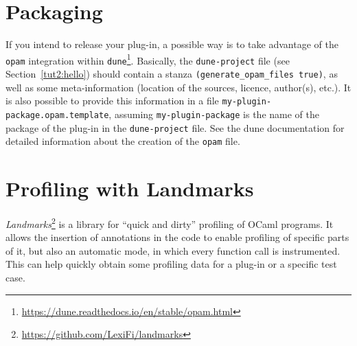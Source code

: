 



\section{Packaging}
\label{sec:dune-packaging}

If you intend to release your plug-in, a possible way is to take advantage of
the \texttt{opam} integration within
\texttt{dune}\footnote{\url{https://dune.readthedocs.io/en/stable/opam.html}}.
Basically, the \texttt{dune-project} file
(see Section~\ref{tut2:hello}) should contain a stanza
\texttt{(generate\_opam\_files true)}, as well as some meta-information
(location of the sources, licence, author(s), etc.). It is also possible to
provide this information in a file \texttt{my-plugin-package.opam.template},
assuming \texttt{my-plugin-package} is the name of the package of the plug-in in
the \texttt{dune-project} file. See the dune documentation for detailed information
about the creation of the \texttt{opam} file.

\section{Profiling with Landmarks} \label{refman:landmarks}

{\em Landmarks}\footnote{\url{https://github.com/LexiFi/landmarks}} is a
library for ``quick and dirty'' profiling of OCaml programs. It allows the
insertion of annotations in the code to enable profiling of specific parts of
it, but also an automatic mode, in which every function call is instrumented.
This can help quickly obtain some profiling data for a plug-in or a specific
test case.

